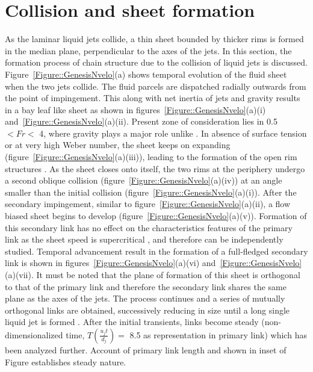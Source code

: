 \documentclass{jfm}
\begin{document}
\section{Collision and sheet formation}
As the laminar liquid jets collide, a thin sheet bounded by thicker rims is formed in the median plane, perpendicular to the axes of the jets. In this section, the formation process of chain structure due to the collision of liquid jets is discussed. Figure~\ref{Figure::GenesisNvelo}(a) shows temporal evolution of the fluid sheet when the two jets collide. The fluid parcels are dispatched radially outwards from the point of impingement. This along with net inertia of jets and gravity results in a bay leaf like sheet as shown in figures~\ref{Figure::GenesisNvelo}(a)(i) and~\ref{Figure::GenesisNvelo}(a)(ii). Present zone of consideration lies in 0.5 $< Fr <$ 4, where gravity plays a major role unlike \cite{bush2004collision,bremond2006atomization}.
In absence of surface tension or at very high Weber number, the sheet keeps on expanding (figure~\ref{Figure::GenesisNvelo}(a)(iii)), leading to the formation of the open rim structures \citep{taylor1960formation,chen2013high}. As the sheet closes onto itself, the two rims at the periphery undergo a second oblique collision (figure~\ref{Figure::GenesisNvelo}(a)(iv)) at an angle smaller than the initial collision (figure~\ref{Figure::GenesisNvelo}(a)(i)). After the secondary impingement, similar to figure~\ref{Figure::GenesisNvelo}(a)(ii), a flow biased sheet begins to develop (figure~\ref{Figure::GenesisNvelo}(a)(v)). Formation of this secondary link has no effect on the characteristics features of the primary link as the sheet speed is supercritical \citep{bush2004collision}, and therefore can be independently studied. Temporal advancement result in the formation of a full-fledged secondary link is shown in figures~\ref{Figure::GenesisNvelo}(a)(vi) and~\ref{Figure::GenesisNvelo}(a)(vii). It must be noted that the plane of formation of this sheet is orthogonal to that of the primary link and therefore the secondary link shares the same plane as the axes of the jets. The process continues and a series of mutually orthogonal links are obtained, successively reducing in size until a long single liquid jet is formed \citep{bush2004collision}. After the initial transients, links become steady (non-dimensionalized time, $T \left(\frac{u_jt}{d_j}\right) = $ 8.5 as representation in primary link) which has been analyzed further. Account of primary link length and shown in inset of Figure establishes steady nature.\\
\end{document}
